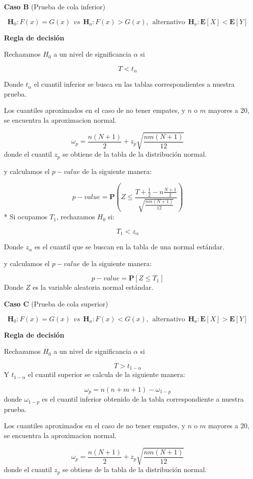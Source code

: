 \documentclass[
  a4paper,
  oneside,
  openany]{book}
\begin{document}
\textbf{Caso B} (Prueba de cola inferior)

\[\textbf{H}_0: F(x) = G(x) \ \ vs \ \ \textbf{H}_a: F(x) > G(x),  \ \ \mbox{alternativo} \ \ \textbf{H}_a:\mathbf{E}[X]  < \mathbf{E}[Y]\]

\textbf{Regla de decisión}

Rechazamos \(H_0\) a un nivel de significancia \(\alpha\) si

\[T < t_{\alpha}\]

Donde \(t_{\alpha}\) el cuantil inferior se busca en las tablas correspondientes a nuestra prueba.

Los cuantiles aproximados en el caso de no tener empates, y \(n\) o \(m\) mayores a 20, se encuentra la aproximacion normal.

\[\omega_p= \frac{n(N+1)}{2} + z_p\sqrt{\frac{n m(N+1)}{12}}\]
donde el cuantil \(z_p\) se obtiene de la tabla de la distribución normal.

y calculamos el \(p-value\) de la siguiente manera:

\[p-value = \mathbf{P}\left(Z\leq\frac{T+\frac{1}{2}-n\frac{N+1}{2}}{\sqrt{\frac{nm(N+1)}{12}}}\right)\]
* Si ocupamos \(T_{1}\), rechazamos \(H_0\) si:

\[T_{1} < z_{\alpha}\]

Donde \(z_{\alpha}\) es el cuantil que se buscan en la tabla de una normal estándar.

y calculamos el \(p-value\) de la siguiente manera:

\[p-value=\mathbf{P}[Z\leq T_{1}]\]
Donde \(Z\) es la variable aleatoria normal estándar.

\textbf{Caso C} (Prueba de cola superior)

\[\textbf{H}_0: F(x) = G(x) \ \ vs \ \ \textbf{H}_a: F(x) < G(x), \  \ \mbox{alternativo} \ \ \textbf{H}_a:\mathbf{E}[X]  > \mathbf{E}[Y]\]

\textbf{Regla de decisión}

Rechazamos \(H_0\) a un nivel de significancia \(\alpha\) si

\[T > t_{1-{\alpha}}\]
Y \(t_{1-\alpha}\) el cuantil superior se calcula de la siguiente manera:

\[\omega_p= n(n+m+1)-\omega_{1-p}\]
donde \(\omega_{1-p}\) es el cuantil inferior obtenido de la tabla correspondiente a nuestra prueba.

Los cuantiles aproximados en el caso de no tener empates, y \(n\) o \(m\) mayores a 20, se encuentra la aproximacion normal.

\[ \omega_p= \frac{n(N+1)}{2} + z_p\sqrt{\frac{n m(N+1)}{12}}\]
donde el cuantil \(z_p\) se obtiene de la tabla de la distribución normal.
\end{document}
